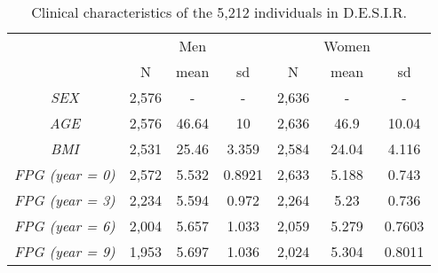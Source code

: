 \begin{table}[ht]
\centering
\caption{Clinical characteristics of the 5,212 individuals in D.E.S.I.R.} 
\label{tab:desir}
{\small
\begin{tabular}{ccccccc}
  \textit{} &  & Men &  &  & Women &  \\ 
   \cline{2-7}\textit{} & N & mean & sd & N & mean & sd \\ 
   \hline
\textit{SEX} & 2,576 & - & - & 2,636 & - & - \\ 
  \textit{AGE} & 2,576 & 46.64 & 10 & 2,636 & 46.9 & 10.04 \\ 
  \textit{BMI} & 2,531 & 25.46 & 3.359 & 2,584 & 24.04 & 4.116 \\ 
   \hline
\textit{FPG (year = 0)} & 2,572 & 5.532 & 0.8921 & 2,633 & 5.188 & 0.743 \\ 
  \textit{FPG (year = 3)} & 2,234 & 5.594 & 0.972 & 2,264 & 5.23 & 0.736 \\ 
  \textit{FPG (year = 6)} & 2,004 & 5.657 & 1.033 & 2,059 & 5.279 & 0.7603 \\ 
  \textit{FPG (year = 9)} & 1,953 & 5.697 & 1.036 & 2,024 & 5.304 & 0.8011 \\ 
   \hline
\end{tabular}
}
\end{table}
